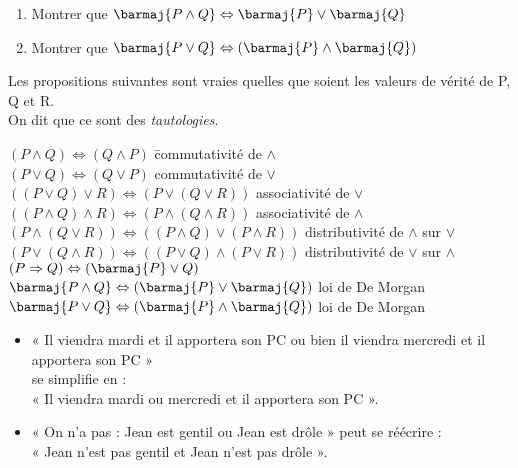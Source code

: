 \begin{exercice}
	
	\begin{enumerate}
		\item 	Montrer que $\barmaj{P\wedge Q}\Leftrightarrow \barmaj{P} \vee \barmaj{Q}$
		\item 	Montrer que $\barmaj{P\vee Q}\Leftrightarrow (\barmaj{P} \wedge \barmaj{Q})$
	\end{enumerate}
\end{exercice}

\begin{propriete}
	Les propositions suivantes sont vraies quelles que soient les valeurs de vérité de P, Q et R.\\
	On dit que ce sont des \textit{tautologies}.
	
	\begin{tabbing}
		$(P\wedge Q) \Leftrightarrow(Q\wedge P)$ 		\hspace{4cm}	\=commutativité de $\wedge$ \\
		$(P\vee Q) \Leftrightarrow(Q\vee P)$ 						 	\>commutativité de $\vee$ \\
		$((P\vee Q)\vee R) \Leftrightarrow(P\vee(Q\vee R))$ 			\>associativité de $\vee$ \\
		$((P\wedge Q)\wedge R) \Leftrightarrow(P\wedge(Q\wedge R))$ 	\>associativité de $\wedge$ \\
		$(P\wedge (Q\vee R))\Leftrightarrow((P\wedge Q)\vee(P\wedge R))$ \>distributivité de $\wedge$ sur $\vee$\\
		$(P\vee (Q\wedge R))\Leftrightarrow((P\vee Q)\wedge(P\vee R))$ \>distributivité de $\vee$ sur $\wedge$\\
		$(P\Rightarrow Q)\Leftrightarrow(\barmaj{P} \vee Q)$\\
		$\barmaj{P\wedge Q}\Leftrightarrow (\barmaj{P}\vee \barmaj{Q})$ \> loi de De Morgan\\
		$\barmaj{P\vee Q}\Leftrightarrow (\barmaj{P} \wedge \barmaj{Q})$ \> loi de De Morgan\\
	\end{tabbing}
\end{propriete}

\begin{exemple}
	
	\begin{itemize}
		\item 	« Il viendra mardi et il apportera son PC ou bien il viendra mercredi et il apportera son PC »\\
		      se simplifie en :\\	« Il viendra mardi ou mercredi et il apportera son PC ».
		\item 	« On n'a pas :  Jean est gentil ou Jean est drôle » peut se réécrire :\\
		      « Jean n'est pas gentil et Jean n'est pas drôle ».
	\end{itemize}
\end{exemple}


